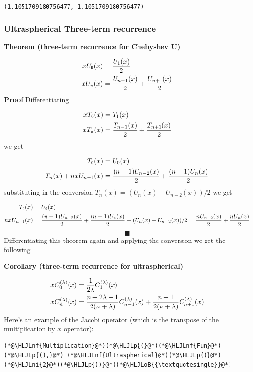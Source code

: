 \documentclass[12pt,a4paper]{article}
\newcommand{\HLJLnf}[1]{\textcolor[RGB]{66,102,213}{#1}}
\newcommand{\HLJLni}[1]{\textcolor[RGB]{59,151,46}{#1}}
\newcommand{\HLJLoB}[1]{\textcolor[RGB]{102,102,102}{\textbf{#1}}}
\newcommand{\HLJLp}[1]{#1}
\begin{document}
\begin{lstlisting}
(1.1051709180756477, 1.1051709180756477)
\end{lstlisting}


\subsubsection{Ultraspherical Three-term recurrence}
\textbf{Theorem (three-term recurrence for Chebyshev U)}


\begin{align*}
x U_0(x) &= {U_1(x) \over 2} \\
x U_n(x) &= {U_{n-1}(x) \over 2} + {U_{n+1}(x) \over 2}
\end{align*}
\textbf{Proof} Differentiating


\begin{align*}
 x T_0(x) &= T_1(x) \\
x T_n(x)  &=  {T_{n-1}(x) \over 2} + {T_{n+1}(x) \over 2}
\end{align*}
we get


\begin{align*}
  T_0(x) &= U_0(x) \\
 T_n(x) + n x U_{n-1}(x)  &=  {(n-1) U_{n-2}(x) \over 2} + {(n+1) U_n(x) \over 2}
\end{align*}
substituting in the conversion $T_n(x) = (U_n(x) - U_{n-2}(x))/2$ we get


\begin{align*}
  T_0(x) &= U_0(x) \\
 n x U_{n-1}(x)  &=  {(n-1) U_{n-2}(x) \over 2} + {(n+1) U_n(x) \over 2} - (U_n(x) - U_{n-2}(x))/2 = {n U_{n-2}(x) \over 2} + {n U_n(x) \over 2}
\end{align*}
\[
\blacksquare
\]
Differentiating this theorem again and applying the conversion we get the following

\textbf{Corollary (three-term recurrence for ultraspherical)}


\begin{align*}
x C_0^{(\lambda)}(x) &= {1 \over 2\lambda } C_1^{(\lambda)}(x) \\
 x C_n^{(\lambda)}(x) &=  {n+2\lambda-1 \over 2(n+\lambda)} C_{n-1}^{(\lambda)}(x) + {n+1 \over 2(n+\lambda)} C_{n+1}^{(\lambda)}(x)
\end{align*}
Here's an example of the Jacobi operator (which is the transpose of the multiplication by $x$ operator):


\begin{lstlisting}
(*@\HLJLnf{Multiplication}@*)(*@\HLJLp{(}@*)(*@\HLJLnf{Fun}@*)(*@\HLJLp{(),}@*) (*@\HLJLnf{Ultraspherical}@*)(*@\HLJLp{(}@*)(*@\HLJLni{2}@*)(*@\HLJLp{))}@*)(*@\HLJLoB{{\textquotesingle}}@*)
\end{lstlisting}
\end{document}
